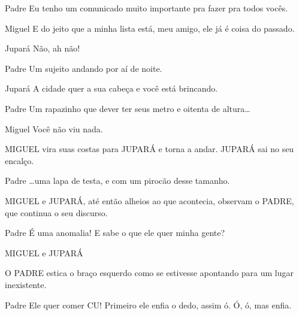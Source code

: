 \documentclass{screenplay}
\begin{document}
\begin{dialogue}{Padre}
    Eu tenho um comunicado muito importante pra fazer pra todos vocês.
\end{dialogue}

\begin{dialogue}{Miguel}
    E do jeito que a minha lista está, meu amigo, ele já é coisa do passado.
\end{dialogue}

\begin{dialogue}{Jupará}
    Não, ah não!
\end{dialogue}

\begin{dialogue}{Padre}
    Um sujeito  andando por aí de noite.
\end{dialogue}

\begin{dialogue}{Jupará}
    A cidade quer a sua cabeça e você está brincando.
\end{dialogue}

\begin{dialogue}{Padre}
    Um rapazinho que dever ter seus metro e oitenta de altura\dots
\end{dialogue}

\begin{dialogue}{Miguel}
    Você não viu nada.
\end{dialogue}

MIGUEL vira suas costas para JUPARÁ e torna a andar. JUPARÁ sai no seu encalço.

\begin{dialogue}{Padre}
    \dots uma lapa de testa, e com um pirocão desse tamanho.
\end{dialogue}

MIGUEL e JUPARÁ, até então alheios ao que acontecia, observam o PADRE, que continua o seu discurso.

\begin{dialogue}{Padre}
    É uma anomalia! E sabe o que ele quer minha gente?
\end{dialogue}

MIGUEL e JUPARÁ \pov

O PADRE estica o braço esquerdo como se estivesse apontando para um lugar inexistente.

\begin{dialogue}{Padre}
    Ele quer comer CU!
    Primeiro ele enfia o dedo, assim ó. Ó, ó, mas enfia.
\end{dialogue}
\end{document}
